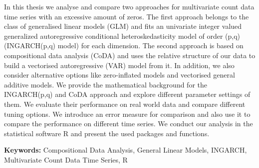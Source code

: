 In this thesis we analyse and compare two approaches for multivariate count data time series with an excessive amount of zeros. The first approach belongs to the class of generalised linear models (GLM) and fits an univariate integer valued generalized autoregressive conditional heteroskedasticity model of order (p,q) (INGARCH(p,q) model) for each dimension. The second approach is based on compositional data analysis (CoDA) and uses the relative structure of our data to build a vectorised autoregressive (VAR) model from it. In addition, we also consider alternative options like zero-inflated models and vectorised general additive models. We provide the mathematical background for the INGARCH(p,q) and CoDA approach and explore different parameter settings of them. We evaluate their performance on real world data and compare different tuning options. We introduce an error measure for comparison and also use it to compare the performance on different time series. We conduct our analysis in the statistical software R and present the used packages and functions. \newline

\textbf{Keywords:} Compositional Data Analysis, General Linear Models, INGARCH, Multivariate Count Data Time Series, R